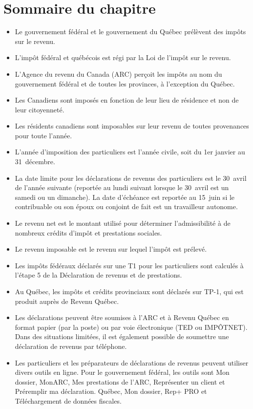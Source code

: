 \section{Sommaire du chapitre}
\begin{itemize}
	\item Le gouvernement fédéral et le gouvernement du Québec prélèvent des impôts sur le revenu.
	\item L'impôt fédéral et québécois est régi par la Loi de l'impôt sur le revenu.
	\item L'Agence du revenu du Canada (ARC) perçoit les impôts au nom du gouvernement fédéral et de toutes les provinces, à l'exception du Québec.
	\item Les Canadiens sont imposés en fonction de leur lieu de résidence et non de leur citoyenneté.
	\item Les résidents canadiens sont imposables sur leur revenu de toutes provenances pour toute l'année.
	\item L'année d'imposition des particuliers est l'année civile, soit du 1er janvier au 31~décembre.
	\item La date limite pour les déclarations de revenus des particuliers est le 30~avril de l'année suivante (reportée au lundi suivant lorsque le 30~avril est un samedi ou un dimanche). La date d'échéance est reportée au 15~juin si le contribuable ou son époux ou conjoint de fait est un travailleur autonome.
	\item Le revenu net est le montant utilisé pour déterminer l'admissibilité à de nombreux crédits d'impôt et prestations sociales.
	\item Le revenu imposable est le revenu sur lequel l'impôt est prélevé.
	\item Les impôts fédéraux déclarés sur une T1 pour les particuliers sont calculés à l'étape 5 de la Déclaration de revenus et de prestations.
	\item Au Québec, les impôts et crédits provinciaux sont déclarés sur TP-1, qui est produit auprès de Revenu Québec.
	\item Les déclarations peuvent être soumises à l'ARC et à Revenu Québec en format papier (par la poste) ou par voie électronique (TED ou IMPÔTNET). Dans des situations limitées, il est également possible de soumettre une déclaration de revenus par téléphone.
	\item Les particuliers et les préparateurs de déclarations de revenus peuvent utiliser divers outils en ligne. Pour le gouvernement fédéral, les outils sont Mon dossier, MonARC, Mes prestations de l'ARC, Représenter un client et Préremplir ma déclaration. Québec, Mon dossier, Rep+ PRO et Téléchargement de données fiscales.
\end{itemize}
